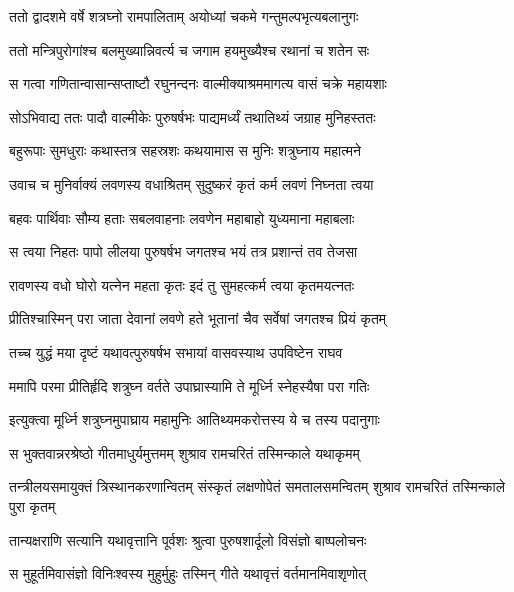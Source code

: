 
\twolineshloka
{ततो द्वादशमे वर्षे शत्रघ्नो रामपालिताम्}
{अयोध्यां चकमे गन्तुमल्पभृत्यबलानुगः} %

\twolineshloka
{ततो मन्त्रिपुरोगांश्च बलमुख्यान्निवर्त्य च}
{जगाम हयमुख्यैश्च रथानां च शतेन सः} %

\twolineshloka
{स गत्वा गणितान्वासान्सप्ताष्टौ रघुनन्दनः}
{वाल्मीक्याश्रममागत्य वासं चक्रे महायशाः} %

\twolineshloka
{सोऽभिवाद्य ततः पादौ वाल्मीकेः पुरुषर्षभः}
{पाद्यमर्ध्यं तथातिथ्यं जग्राह मुनिहस्ततः} %

\twolineshloka
{बहुरूपाः सुमधुराः कथास्तत्र सहस्रशः}
{कथयामास स मुनिः शत्रुघ्नाय महात्मने} %

\twolineshloka
{उवाच च मुनिर्वाक्यं लवणस्य वधाश्रितम्}
{सुदुष्करं कृतं कर्म लवणं निघ्नता त्वया} %

\twolineshloka
{बहवः पार्थिवाः सौम्य हताः सबलवाहनाः}
{लवणेन महाबाहो युध्यमाना महाबलाः} %

\twolineshloka
{स त्वया निहतः पापो लीलया पुरुषर्षभ}
{जगतश्च भयं तत्र प्रशान्तं तव तेजसा} %

\twolineshloka
{रावणस्य वधो घोरो यत्नेन महता कृतः}
{इदं तु सुमहत्कर्म त्वया कृतमयत्नतः} %

\twolineshloka
{प्रीतिश्चास्मिन् परा जाता देवानां लवणे हते}
{भूतानां चैव सर्वेषां जगतश्च प्रियं कृतम्} %

\twolineshloka
{तच्च युद्धं मया दृष्टं यथावत्पुरुषर्षभ}
{सभायां वासवस्याथ उपविष्टेन राघव} %

\twolineshloka
{ममापि परमा प्रीतिर्हृदि शत्रुघ्न वर्तते}
{उपाघ्रास्यामि ते मूर्ध्नि स्नेहस्यैषा परा गतिः} %

\twolineshloka
{इत्युक्त्वा मूर्ध्नि शत्रुघ्नमुपाघ्राय महामुनिः}
{आतिथ्यमकरोत्तस्य ये च तस्य पदानुगाः} %

\twolineshloka
{स भुक्तवान्नरश्रेष्ठो गीतमाधुर्यमुत्तमम्}
{शुश्राव रामचरितं तस्मिन्काले यथाकृमम्} %

\threelineshloka
{तन्त्रीलयसमायुक्तं त्रिस्थानकरणान्वितम्}
{संस्कृतं लक्षणोपेतं समतालसमन्वितम्}
{शुश्राव रामचरितं तस्मिन्काले पुरा कृतम्} %

\twolineshloka
{तान्यक्षराणि सत्यानि यथावृत्तानि पूर्वशः}
{श्रुत्वा पुरुषशार्दूलो विसंज्ञो बाष्पलोचनः} %

\twolineshloka
{स मुहूर्तमिवासंज्ञो विनिःश्वस्य मुहुर्मुहुः}
{तस्मिन् गीते यथावृत्तं वर्तमानमिवाशृणोत्} %


